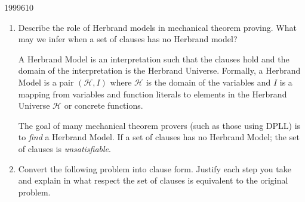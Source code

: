 \documentclass[10pt,\jkfside,a4paper]{article}
\begin{document}
\begin{examquestion}{1999}{6}{10}

\begin{enumerate}

\item Describe the role of Herbrand models in mechanical theorem proving.
What may we infer when a set of clauses has no Herbrand model?

A Herbrand Model is an interpretation such that the clauses hold and the
domain of the interpretation is the Herbrand Universe. Formally, a Herbrand
Model is a pair $(\mathcal{H}, I)$ where $\mathcal{H}$ is the domain of the
variables and $I$ is a mapping from variables and function literals to
elements in the Herbrand Universe $\mathcal{H}$ or concrete functions.

The goal of many mechanical theorem provers (such as those using DPLL) is to
\textit{find} a Herbrand Model. If a set of clauses has no Herbrand Model;
the set of clauses is \textit{unsatisfiable}.

\item Convert the following problem into clause form. Justify each step you
take and explain in what respect the set of clauses is equivalent to the
original problem.


\end{enumerate}
\end{examquestion}
\end{document}

